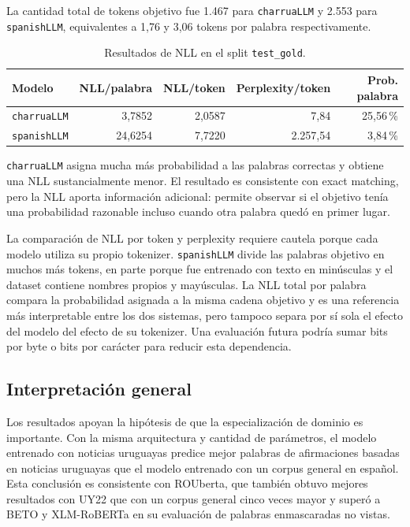 \documentclass[11pt,a4paper]{article}
\newcommand{\charrua}{\texttt{charruaLLM}}
\newcommand{\spanishmodel}{\texttt{spanishLLM}}
\newcommand{\code}[1]{\texttt{#1}}
\begin{document}
La cantidad total de tokens objetivo fue 1.467 para \charrua{} y 2.553 para
\spanishmodel, equivalentes a 1,76 y 3,06 tokens por palabra respectivamente.

\begin{table}[H]
    \centering
    \small
    \caption{Resultados de NLL en el split \code{test\_gold}.}
    \label{tab:nll-test}
    \begin{tabular}{lrrrr}
        \toprule
        Modelo & NLL/palabra & NLL/token & Perplexity/token & Prob. palabra \\
        \midrule
        \charrua & 3,7852 & 2,0587 & 7,84 & 25,56\,\% \\
        \spanishmodel & 24,6254 & 7,7220 & 2.257,54 & 3,84\,\% \\
        \bottomrule
    \end{tabular}
\end{table}

\charrua{} asigna mucha más probabilidad a las palabras correctas y obtiene una
NLL sustancialmente menor. El resultado es consistente con exact matching, pero
la NLL aporta información adicional: permite observar si el objetivo tenía una
probabilidad razonable incluso cuando otra palabra quedó en primer lugar.

La comparación de NLL por token y perplexity requiere cautela porque cada
modelo utiliza su propio tokenizer. \spanishmodel{} divide las palabras
objetivo en muchos más tokens, en parte porque fue entrenado con texto en
minúsculas y el dataset contiene nombres propios y mayúsculas. La NLL total por
palabra compara la probabilidad asignada a la misma cadena objetivo y es una
referencia más interpretable entre los dos sistemas, pero tampoco separa por sí
sola el efecto del modelo del efecto de su tokenizer. Una evaluación futura
podría sumar bits por byte o bits por carácter para reducir esta dependencia.


\subsection{Interpretación general}

Los resultados apoyan la hipótesis de que la especialización de dominio es
importante. Con la misma arquitectura y cantidad de parámetros, el modelo
entrenado con noticias uruguayas predice mejor palabras de afirmaciones basadas
en noticias uruguayas que el modelo entrenado con un corpus general en español.
Esta conclusión es consistente con ROUberta, que también obtuvo mejores
resultados con UY22 que con un corpus general cinco veces mayor y superó a BETO
y XLM-RoBERTa en su evaluación de palabras enmascaradas no vistas.
\end{document}
